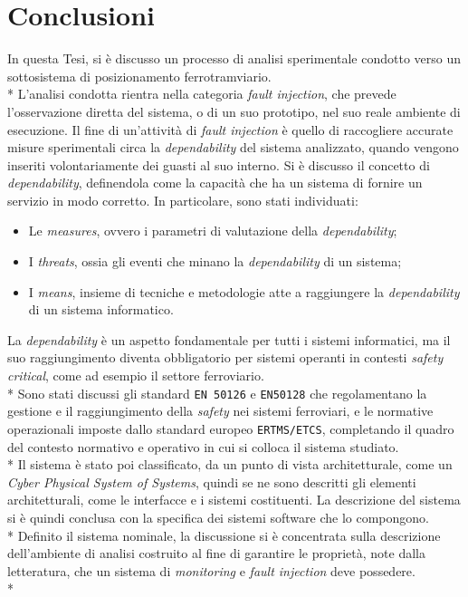 \chapter{Conclusioni}
In questa Tesi, si \`e discusso un processo di analisi sperimentale condotto verso un sottosistema di posizionamento ferrotramviario.\\*
L'analisi condotta rientra nella categoria \emph{fault injection}, che prevede l'osservazione diretta del sistema, o di un suo prototipo, nel suo reale ambiente di esecuzione. Il fine di un'attivit\`a di \emph{fault injection} \`e quello di raccogliere accurate misure sperimentali circa la \emph{dependability} del sistema analizzato, quando vengono inseriti volontariamente dei guasti al suo interno. Si \`e discusso il concetto di \emph{dependability}, definendola come la capacit\`a che ha un sistema di fornire un servizio in modo corretto. In particolare, sono stati individuati:
\begin{itemize}
	\item Le \emph{measures}, ovvero i parametri di valutazione della \emph{dependability};
	\item I \emph{threats}, ossia gli eventi che minano la \emph{dependability} di un sistema;
	\item I \emph{means}, insieme di tecniche e metodologie atte a raggiungere la \emph{dependability} di un sistema informatico.
\end{itemize}
La \emph{dependability} \`e un aspetto fondamentale per tutti i sistemi informatici, ma il suo raggiungimento diventa obbligatorio per sistemi operanti in contesti \emph{safety critical}, come ad esempio il settore ferroviario.\\*
Sono stati discussi gli standard \texttt{EN 50126} e \texttt{EN50128} che regolamentano la gestione e il raggiungimento della \emph{safety} nei sistemi ferroviari, e le normative operazionali imposte dallo standard europeo \texttt{ERTMS/ETCS}, completando il quadro del contesto normativo e operativo in cui si colloca il sistema studiato.\\*
Il sistema \`e stato poi classificato, da un punto di vista architetturale, come un \emph{Cyber Physical System of Systems}, quindi se ne sono descritti gli elementi architetturali, come le interfacce e i sistemi costituenti. La descrizione del sistema si \`e quindi conclusa con la specifica dei sistemi software che lo compongono.\\*
Definito il sistema nominale, la discussione si \`e concentrata sulla descrizione dell'ambiente di analisi costruito al fine di garantire le propriet\`a, note dalla letteratura, che un sistema di \emph{monitoring} e \emph{fault injection} deve possedere.\\*
